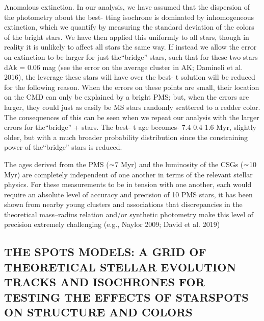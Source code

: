 \documentclass[../Main.tex]{subfiles}
\begin{document}

Anomalous extinction. In our analysis, we have assumed
that the dispersion of the photometry about the best- tting
isochrone is dominated by inhomogeneous extinction, which
we quantify by measuring the standard deviation of the colors
of the bright stars. We have then applied this uniformly to all
stars, though in reality it is unlikely to affect all stars the same
way. If instead we allow the error on extinction to be larger for
just the“bridge” stars, such that for these two stars dAk = 0.06
mag (see the error on the average cluster in AK; Damineli et al.
2016), the leverage these stars will have over the best- t
solution will be reduced for the following reason. When the
errors on these points are small, their location on the CMD can
only be explained by a bright PMS; but, when the errors are
larger, they could just as easily be MS stars randomly scattered
to a redder color. The consequences of this can be seen when
we repeat our analysis with the larger errors for the“bridge”
+
stars. The best- t age becomes-
7.4 0.4
1.6 Myr, slightly older,
but with a much broader probability distribution since the
constraining power of the“bridge” stars is reduced.

The ages
derived from the PMS (∼7 Myr) and the luminosity of the
CSGs (∼10 Myr) are completely independent of one another in
terms of the relevant stellar physics. For these measurements to
be in tension with one another, each would require an absolute
level of accuracy and precision of 10%
PMS stars, it has been shown from nearby young clusters and
associations that discrepancies in the theoretical mass–radius
relation and/or synthetic photometry make this level of
precision extremely challenging (e.g., Naylor 2009; David
et al. 2019)

\subsection{THE SPOTS MODELS: A GRID OF THEORETICAL STELLAR EVOLUTION TRACKS AND ISOCHRONES
FOR TESTING THE EFFECTS OF STARSPOTS ON STRUCTURE AND COLORS}


\end{document}
